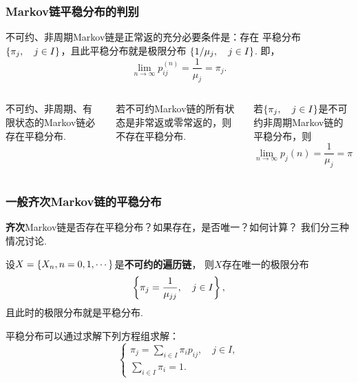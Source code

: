 \begin{frame}
    \frametitle{Markov链平稳分布的判别}
    \begin{mytheorem}[Markov链平稳分布的判别]
        不可约、非周期Markov链是正常返的充分必要条件是：存在
        平稳分布$\left\{\pi_j,\quad j\in I\right\}$，且此平稳分布就是极限分布
        $\left\{1/\mu_j,\quad j\in I\right\}$. 即，
        \begin{equation}
            \lim_{n\to\infty}p_{ij}^{(n)}=\frac1{\mu_j}=\pi_j.
        \end{equation} 
    \end{mytheorem}
    \begin{columns}
        \begin{column}{.18\columnwidth}
            \begin{mycorollary}
                不可约、非周期、有限状态的Markov链必存在平稳分布. 
            \end{mycorollary}
        \end{column}
        \begin{column}{.22\columnwidth}
            \begin{mycorollary}
                若不可约Markov链的所有状态是非常返或零常返的，则不存在平稳分布. 
            \end{mycorollary}
        \end{column}
        \begin{column}{.5\columnwidth}
            \begin{mycorollary}
                若$\left\{\pi_j,\quad j\in I\right\}$是不可约非周期Markov链的
                平稳分布，则
                \begin{equation}
                    \lim_{n\to\infty}p_j(n)=\frac1{\mu_j}=\pi_j.
                \end{equation}
            \end{mycorollary}
        \end{column}        
    \end{columns}
\end{frame}

\begin{frame}
    \frametitle{一般齐次Markov链的平稳分布}
    \textbf{齐次}Markov链是否存在平稳分布？如果存在，是否唯一？如何计算？
    我们分三种情况讨论. 
    \begin{mytheorem}[不可约遍历链]
        设$X=\left\{X_n,n=0,1,\cdots\right\}$是\textbf{不可约的遍历链}，
        则$X$存在唯一的极限分布
        \begin{equation*}
            \left\{\pi_j=\frac1{\mu_{jj}},\quad j\in I\right\},
        \end{equation*}
        且此时的极限分布就是平稳分布. 

        平稳分布可以通过求解下列方程组求解：
        \begin{equation*}
            \begin{cases}
                \pi_j=\displaystyle\sum_{i\in I}\pi_i p_{ij},\quad j\in I,\\
                \displaystyle\sum_{i\in I}\pi_i=1.
            \end{cases}
        \end{equation*}
    \end{mytheorem}
\end{frame}


